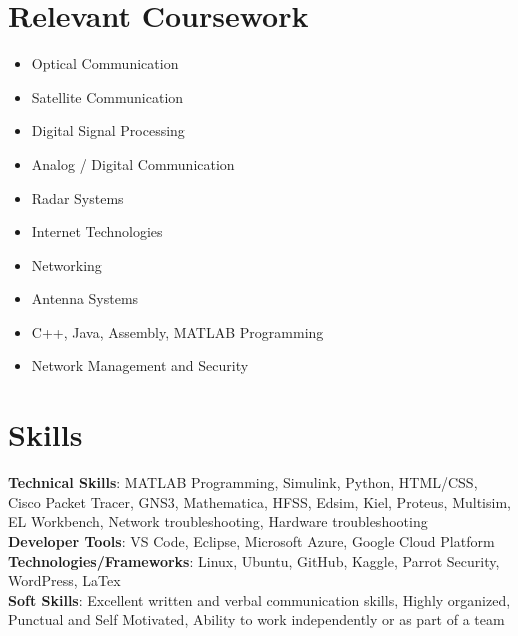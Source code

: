 \documentclass[letterpaper,11pt]{article}
\newcommand{\resumeSubHeadingListStart}{\begin{itemize}[leftmargin=0.0in, label={}]}
\newcommand{\resumeSubHeadingListEnd}{\end{itemize}}
\begin{document}
\section{Relevant Coursework}
        \begin{multicols}{4}
            \begin{itemize}[itemsep=-5pt, parsep=3pt]
                \item\small Optical Communication
                \item Satellite Communication
                \item Digital Signal Processing
                \item Analog / Digital Communication
                \item Radar Systems 
                \item Internet Technologies
                \item Networking
                \item Antenna Systems
                \item C++, Java, Assembly, MATLAB Programming
                \item Network Management and Security
            \end{itemize}
        \end{multicols}
        \vspace*{2.0\multicolsep}


\section{Skills}
 \begin{itemize}[leftmargin=0.15in, label={}]
    \small{\item{
     \textbf{Technical Skills}{: MATLAB Programming, Simulink, Python, HTML/CSS, Cisco Packet Tracer, GNS3, Mathematica, HFSS, Edsim, Kiel, Proteus, Multisim, EL Workbench,  Network troubleshooting, Hardware troubleshooting} \\
     \textbf{Developer Tools}{: VS Code, Eclipse, Microsoft Azure, Google Cloud Platform} \\
     \textbf{Technologies/Frameworks}{: Linux, Ubuntu, GitHub, Kaggle, Parrot Security, WordPress, LaTex} \\
     \textbf{Soft Skills}{: Excellent written and verbal communication skills, Highly organized, Punctual and Self Motivated, Ability to work independently or as part of a team} \\
    }}
 \end{itemize}
 \vspace{-16pt}
\end{document}
